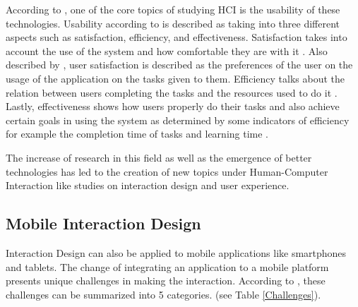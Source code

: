 According to , one of the core topics of studying HCI is the usability of these technologies. Usability according to  is described as taking into three different aspects such as satisfaction, efficiency, and effectiveness. Satisfaction takes into account the use of the system and how comfortable they are with it . Also described by , user satisfaction is described as the preferences of the user on the usage of the application on the tasks given to them. Efficiency talks about the relation between users completing the tasks and the resources used to do it \cite{frokjaer2000measuring}. Lastly, effectiveness shows how users properly do their tasks and also achieve certain goals in using the system as determined by some indicators of efficiency for example the completion time of tasks and learning time \cite{frokjaer2000measuring}.

The increase of research in this field as well as the emergence of better technologies has led to the creation of new topics under Human-Computer Interaction like studies on interaction design and user experience.

\subsection{Mobile Interaction Design} 
Interaction Design can also be applied to mobile applications like smartphones and tablets. The change of integrating an application to a mobile platform presents unique challenges in making the interaction. According to , these challenges can be summarized into 5 categories. (see Table \ref{Challenges}).


